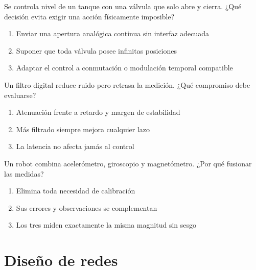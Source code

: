 \noindent\begin{minipage}{\linewidth}\setlength{\parskip}{4pt}\label{q:H-098}
Se controla nivel de un tanque con una válvula que solo abre y cierra. ¿Qué decisión evita exigir una acción físicamente imposible?
\begin{enumerate}[label=\Alph*),nosep]
\item Enviar una apertura analógica continua sin interfaz adecuada
\item Suponer que toda válvula posee infinitas posiciones
\item Adaptar el control a conmutación o modulación temporal compatible
\end{enumerate}\end{minipage}\par\medskip

\noindent\begin{minipage}{\linewidth}\setlength{\parskip}{4pt}\label{q:H-099}
Un filtro digital reduce ruido pero retrasa la medición. ¿Qué compromiso debe evaluarse?
\begin{enumerate}[label=\Alph*),nosep]
\item Atenuación frente a retardo y margen de estabilidad
\item Más filtrado siempre mejora cualquier lazo
\item La latencia no afecta jamás al control
\end{enumerate}\end{minipage}\par\medskip

\noindent\begin{minipage}{\linewidth}\setlength{\parskip}{4pt}\label{q:H-100}
Un robot combina acelerómetro, giroscopio y magnetómetro. ¿Por qué fusionar las medidas?
\begin{enumerate}[label=\Alph*),nosep]
\item Elimina toda necesidad de calibración
\item Sus errores y observaciones se complementan
\item Los tres miden exactamente la misma magnitud sin sesgo
\end{enumerate}\end{minipage}\par\medskip

\section{Diseño de redes}

